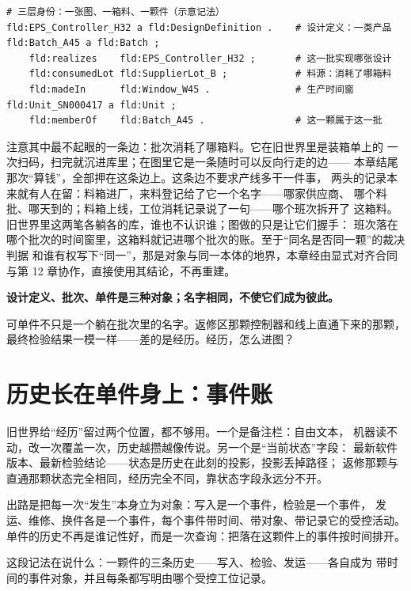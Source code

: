 \nopagebreak[4]
\begin{codebox}
\begin{Verbatim}[fontsize=\small,breaklines=true,breakanywhere=true,breaksymbolleft={},breaksymbolright={}]
# 三层身份：一张图、一箱料、一颗件（示意记法）
fld:EPS_Controller_H32 a fld:DesignDefinition .    # 设计定义：一类产品
fld:Batch_A45 a fld:Batch ;
    fld:realizes    fld:EPS_Controller_H32 ;       # 这一批实现哪张设计
    fld:consumedLot fld:SupplierLot_B ;            # 料源：消耗了哪箱料
    fld:madeIn      fld:Window_W45 .               # 生产时间窗
fld:Unit_SN000417 a fld:Unit ;
    fld:memberOf    fld:Batch_A45 .                # 这一颗属于这一批
\end{Verbatim}
\end{codebox}

注意其中最不起眼的一条边：批次消耗了哪箱料。它在旧世界里是装箱单上的
一次扫码，扫完就沉进库里；在图里它是一条随时可以反向行走的边——
本章结尾那次“算钱”，全部押在这条边上。这条边不要求产线多干一件事，
两头的记录本来就有人在留：料箱进厂，来料登记给了它一个名字——哪家供应商、
哪个料批、哪天到的；料箱上线，工位消耗记录说了一句——哪个班次拆开了
这箱料。旧世界里这两笔各躺各的库，谁也不认识谁；图做的只是让它们握手：
班次落在哪个批次的时间窗里，这箱料就记进哪个批次的账。至于“同名是否同一颗”的裁决判据
和谁有权写下“同一”，那是对象与同一本体的地界，本章经由显式对齐合同
与第 12 章协作，直接使用其结论，不再重建。

\textbf{设计定义、批次、单件是三种对象；名字相同，不使它们成为彼此。}

可单件不只是一个躺在批次里的名字。返修区那颗控制器和线上直通下来的那颗，
最终检验结果一模一样——差的是经历。经历，怎么进图？

\section{历史长在单件身上：事件账}

旧世界给“经历”留过两个位置，都不够用。一个是备注栏：自由文本，
机器读不动，改一次覆盖一次，历史越攒越像传说。另一个是“当前状态”字段：
最新软件版本、最新检验结论——状态是历史在此刻的投影，投影丢掉路径；
返修那颗与直通那颗状态完全相同，经历完全不同，靠状态字段永远分不开。

出路是把每一次“发生”本身立为对象：写入是一个事件，检验是一个事件，
发运、维修、换件各是一个事件，每个事件带时间、带对象、带记录它的受控活动。
单件的历史不再是谁记性好，而是一次查询：把落在这颗件上的事件按时间排开。

这段记法在说什么：一颗件的三条历史——写入、检验、发运——各自成为
带时间的事件对象，并且每条都写明由哪个受控工位记录。

